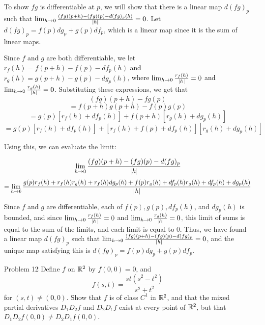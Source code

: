 \documentclass{hmwk}
\begin{document}
\begin{solution}

\pre To show $fg$ is differentiable at $p$, we will show that there is a linear map $d(fg)_p$ such that $\lim_{h \rightarrow 0}\frac{(fg)(p + h) - (fg)(p) - d(fg)_p(h)}{|h|} = 0$. Let $d(fg)_p = f(p)dg_p + g(p)df_p$, which is a linear map since it is the sum of linear maps. 

\pre Since $f$ and $g$ are both differentiable, we let $r_f(h) = f(p + h) - f(p) - df_p(h)$ and $r_g(h) = g(p + h) - g(p) - dg_p(h)$, where $\lim_{h \rightarrow 0}\frac{r_f(h)}{|h|} = 0$ and $\lim_{h \rightarrow 0}\frac{r_g(h)}{|h|} = 0$. Substituting these expressions, we get that 
$$(fg)(p+h) - fg(p)$$
$$=f(p+h)g(p+h) - f(p)g(p)$$
$$= g(p)[r_f(h) + df_p(h)] + f(p+h)[r_g(h) + dg_p(h)]$$
$$= g(p)[r_f(h) + df_p(h)] + [r_f(h) + f(p) + df_p(h)][r_g(h) + dg_p(h)]$$

\pre Using this, we can evaluate the limit:

$$\lim_{h \rightarrow 0}\frac{(fg)(p+h) - (fg)(p) - d(fg)_p}{|h|}$$
$$= \lim_{h \rightarrow 0}\frac{g(p)r_f(h) + r_f(h)r_g(h) + r_f(h)dg_p(h) + f(p)r_g(h) + df_p(h)r_g(h) + df_p(h) + dg_p(h)}{|h|}$$

\pre Since $f$ and $g$ are differentiable, each of $f(p), g(p), df_p(h)$, and $dg_p(h)$ is bounded, and since $\lim_{h \rightarrow 0}\frac{r_f(h)}{|h|} = 0$ and $\lim_{h \rightarrow 0}\frac{r_g(h)}{|h|} = 0$, this limit of sums is equal to the sum of the limits, and each limit is equal to 0. Thus, we have found a linear map $d(fg)_p$ such that $\lim_{h \rightarrow 0}\frac{(fg)(p+h) - (fg)(p) - d(fg)_p}{|h|} = 0$, and the unique map satisfying this is $d(fg)_p = f(p)dg_p + g(p)df_p$.

\end{solution}

\begin{problem}{Problem 12}
Define $f$ on $\mathbb{R}^2$ by $f(0, 0) = 0$, and 
$$f(s, t) = \frac{st(s^2 - t^2)}{s^2 + t^2}$$
for $(s, t) \neq (0, 0)$. Show that $f$ is of class $C^1$ in $\mathbb{R}^2$, and that the mixed partial derivatives $D_1D_2f$ and $D_2D_1f$ exist at every point of $\mathbb{R}^2$, but that $D_1D_2f(0, 0) \neq D_2D_1f(0, 0)$.
\end{problem}
\end{document}
